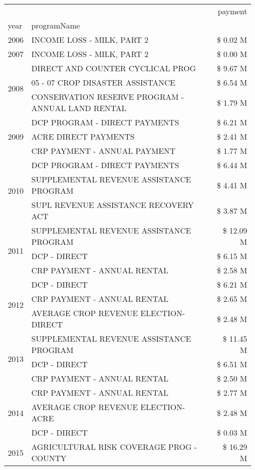 \begin{tabular}{llr}
\toprule
 &  & payment \\
year & programName &  \\
\midrule
2006 & INCOME LOSS - MILK, PART 2 & \$ 0.02 M \\
\cline{1-3}
2007 & INCOME LOSS - MILK, PART 2 & \$ 0.00 M \\
\cline{1-3}
\multirow[t]{3}{*}{2008} & DIRECT AND COUNTER CYCLICAL PROG & \$ 9.67 M \\
 & 05 - 07 CROP DISASTER ASSISTANCE & \$ 6.54 M \\
 & CONSERVATION RESERVE PROGRAM - ANNUAL LAND RENTAL & \$ 1.79 M \\
\cline{1-3}
\multirow[t]{3}{*}{2009} & DCP PROGRAM - DIRECT PAYMENTS & \$ 6.21 M \\
 & ACRE DIRECT PAYMENTS & \$ 2.41 M \\
 & CRP PAYMENT - ANNUAL PAYMENT & \$ 1.77 M \\
\cline{1-3}
\multirow[t]{3}{*}{2010} & DCP PROGRAM - DIRECT PAYMENTS & \$ 6.44 M \\
 & SUPPLEMENTAL REVENUE ASSISTANCE PROGRAM & \$ 4.41 M \\
 & SUPL REVENUE ASSISTANCE RECOVERY ACT & \$ 3.87 M \\
\cline{1-3}
\multirow[t]{3}{*}{2011} & SUPPLEMENTAL REVENUE ASSISTANCE PROGRAM & \$ 12.09 M \\
 & DCP - DIRECT & \$ 6.15 M \\
 & CRP PAYMENT - ANNUAL RENTAL & \$ 2.58 M \\
\cline{1-3}
\multirow[t]{3}{*}{2012} & DCP - DIRECT & \$ 6.21 M \\
 & CRP PAYMENT - ANNUAL RENTAL & \$ 2.65 M \\
 & AVERAGE CROP REVENUE ELECTION-DIRECT & \$ 2.48 M \\
\cline{1-3}
\multirow[t]{3}{*}{2013} & SUPPLEMENTAL REVENUE ASSISTANCE PROGRAM & \$ 11.45 M \\
 & DCP - DIRECT & \$ 6.51 M \\
 & CRP PAYMENT - ANNUAL RENTAL & \$ 2.50 M \\
\cline{1-3}
\multirow[t]{3}{*}{2014} & CRP PAYMENT - ANNUAL RENTAL & \$ 2.77 M \\
 & AVERAGE CROP REVENUE ELECTION-ACRE & \$ 2.48 M \\
 & DCP - DIRECT & \$ 0.03 M \\
\cline{1-3}
\multirow[t]{3}{*}{2015} & AGRICULTURAL RISK COVERAGE PROG - COUNTY & \$ 16.29 M \\

\end{tabular}
